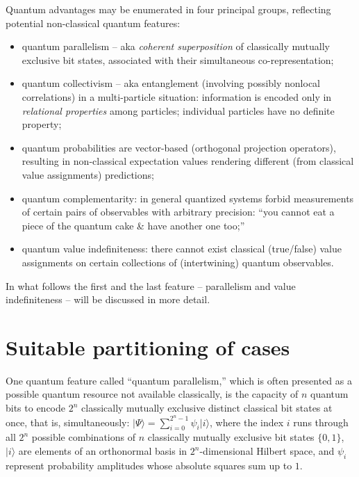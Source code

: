 \documentclass[runningheads]{llncs}
\begin{document}
Quantum advantages may be enumerated in four principal groups, reflecting potential non-classical quantum features:
\begin{itemize}
\item
quantum parallelism -- aka {\it coherent superposition} of classically mutually exclusive bit states,
associated with their simultaneous co-representation;

\item
quantum collectivism -- aka entanglement (involving possibly nonlocal correlations)  in a multi-particle situation: information
is encoded only in {\it relational properties} among particles; individual particles have no definite property;


\item
quantum probabilities are vector-based (orthogonal projection operators), resulting in non-classical
expectation values rendering different (from classical value assignments) predictions;


\item
quantum complementarity: in general quantized systems forbid measurements of certain pairs of observables with arbitrary precision:
``you cannot eat a piece of the quantum cake \& have another one too;''


\item
quantum value indefiniteness: there cannot exist classical (true/false) value assignments on certain collections of (intertwining) quantum observables.

\end{itemize}

In what follows the first and the last feature -- parallelism and value indefiniteness -- will be discussed in more detail.


\section{Suitable partitioning of cases}

One quantum feature called ``quantum parallelism,''
which is often presented as a possible quantum resource not available classically,
is the capacity of $n$ quantum bits to encode $2^n$ classically
mutually exclusive distinct classical bit states at once, that is, simultaneously:
$
\vert \Psi \rangle = \sum_{i=0}^{2^n-1} \psi_i \vert i \rangle
$,
where the index $i$ runs through all $2^n$ possible combinations of $n$ classically mutually exclusive bit states $\{0,1\}$,
$\vert i \rangle $ are elements of an orthonormal basis in $2^n$-dimensional Hilbert space,
and $\psi_i$ represent probability amplitudes whose absolute squares sum up to $1$.
\end{document}
